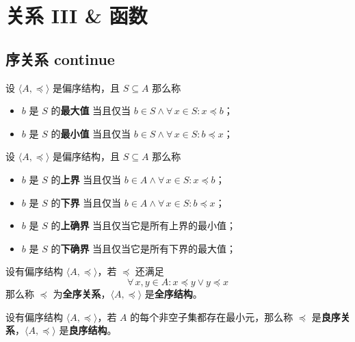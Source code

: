 \section{关系 III \& 函数}

\subsection{序关系 continue}

\begin{definition}[最大值和最小值]
    设 $\langle A, \preceq \rangle$ 是偏序结构，且 $S \subseteq A$ 那么称
    \begin{itemize}
        \item $b$ 是 $S$ 的\textbf{最大值} 当且仅当 $b \in S \land \forall\,x \in S: x \preceq b$；
        \item $b$ 是 $S$ 的\textbf{最小值} 当且仅当 $b \in S \land \forall\,x \in S: b \preceq x$；
    \end{itemize}
\end{definition}

\begin{definition}[上界和下界]
    设 $\langle A, \preceq \rangle$ 是偏序结构，且 $S \subseteq A$ 那么称
    \begin{itemize}
        \item $b$ 是 $S$ 的\textbf{上界} 当且仅当 $b \in A \land \forall\,x \in S: x \preceq b$；
        \item $b$ 是 $S$ 的\textbf{下界} 当且仅当 $b \in A \land \forall\,x \in S: b \preceq x$；
        \item $b$ 是 $S$ 的\textbf{上确界} 当且仅当它是所有上界的最小值；
        \item $b$ 是 $S$ 的\textbf{下确界} 当且仅当它是所有下界的最大值；
    \end{itemize}
\end{definition}

\begin{definition}[全序结构]
    设有偏序结构 $\langle A, \preceq \rangle$，若 $\preceq$ 还满足
    $$
    \forall\,x, y \in A: x \preceq y \lor y \preceq x
    $$
    那么称 $\preceq$ 为\textbf{全序关系}，$\langle A, \preceq \rangle$ 是\textbf{全序结构}。
\end{definition}

\begin{definition}[良序结构]
    设有偏序结构 $\langle A, \preceq \rangle$，若 $A$ 的每个非空子集都存在最小元，那么称 $\preceq$ 是\textbf{良序关系}，$\langle A, \preceq \rangle$ 是\textbf{良序结构}。
\end{definition}

